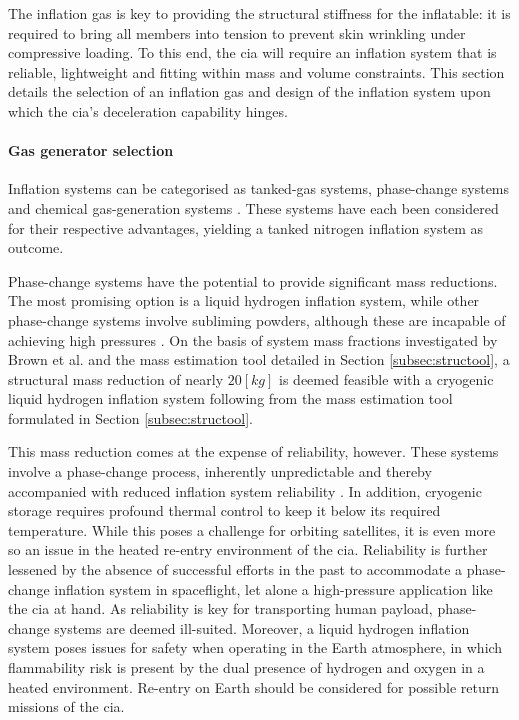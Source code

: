 The inflation gas is key to providing the structural stiffness for the inflatable: it is required to bring all members into tension to prevent skin wrinkling under compressive loading. To this end, the \gls{cia} will require an inflation system that is reliable, lightweight and fitting within mass and volume constraints. This section details the selection of an inflation gas and design of the inflation system upon which the \gls{cia}'s deceleration capability hinges.

\paragraph{Gas generator selection}
Inflation systems can be categorised as tanked-gas systems, phase-change systems and chemical gas-generation systems \cite{Jenkins2001}. These systems have each been considered for their respective advantages, yielding a tanked nitrogen inflation system as outcome. 

Phase-change systems have the potential to provide significant mass reductions. The most promising option is a liquid hydrogen inflation system, while other phase-change systems involve subliming powders, although these are incapable of achieving high pressures \cite{Freeland1998}.  On the basis of system mass fractions investigated by Brown et al. \cite{Brown2009} and the mass estimation tool detailed in Section \ref{subsec:structool}, a structural mass reduction of nearly $20 \left[kg\right]$ is deemed feasible with a cryogenic liquid hydrogen inflation system following from the mass estimation tool formulated in Section \ref{subsec:structool}. 


This mass reduction comes at the expense of reliability, however. These systems involve a phase-change process, inherently unpredictable and thereby accompanied with reduced inflation system reliability \cite{Jenkins2001}. In addition, cryogenic storage requires profound thermal control to keep it below its required temperature. While this poses a challenge for orbiting satellites, it is even more so an issue in the heated re-entry environment of the \gls{cia}. Reliability is further lessened by the absence of successful efforts in the past to accommodate a phase-change inflation system in spaceflight, let alone a high-pressure application like the \gls{cia} at hand. As reliability is key for transporting human payload, phase-change systems are deemed ill-suited. Moreover, a liquid hydrogen inflation system poses issues for safety when operating in the Earth atmosphere, in which flammability risk is present by the dual presence of hydrogen and oxygen in a heated environment. Re-entry on Earth should be considered for possible return missions of the \gls{cia}.


